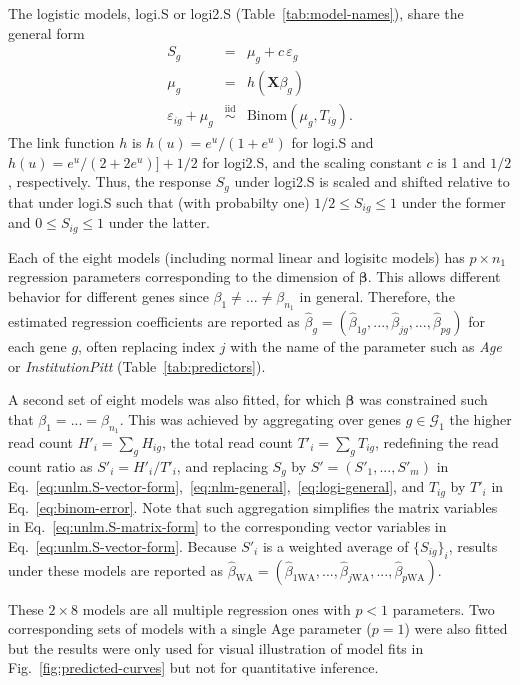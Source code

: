 \documentclass[12pt,letterpaper]{article}
\begin{document}
The logistic models, logi.S or logi2.S (Table~\ref{tab:model-names}), share the general form
\begin{eqnarray}
S_g &=& \mu_g + c\, \varepsilon_g
\label{eq:logi-general}
\\
\mu_g &=& h(\mathbf{X} \beta_g)
\label{eq:glm-mean-predictor}
\\
\varepsilon_{ig} + \mu_g &\overset{\mathrm{iid}}{\sim}& \mathrm{Binom}(\mu_g, T_{ig}).
\label{eq:binom-error}
\end{eqnarray}
The link function \(h\) is \(h(u) = e^u / (1 + e^u)\) for logi.S and \(h(u) =
e^u / (2 + 2e^u)] + 1/2\) for logi2.S, and the scaling constant \(c\) is 1
 and \(1/2\), respectively.  Thus, the response \(S_g\) under logi2.S is scaled and shifted relative to
that under logi.S such that (with probabilty one) \(1/2\le S_{ig}\le 1\) under the former and
\(0\le S_{ig}\le 1\) under the latter.

Each of the eight models (including normal linear and logisitc models) has \(p\times n_1\) regression parameters corresponding to the
dimension of \(\boldsymbol{\beta}\).  This allows different behavior for
different genes since \(\beta_1\neq ...\neq\beta_{n_1}\) in general.
Therefore, the estimated regression coefficients are reported as \(\hat{\beta}_g =
(\hat{\beta}_{1g},...,\hat{\beta}_{jg},...,\hat{\beta}_{pg})\) for each gene \(g\), often
replacing index \(j\) with the name of the parameter such as \emph{Age} or
\emph{InstitutionPitt} (Table~\ref{tab:predictors}).

A second set of eight models was also
fitted, for which \(\boldsymbol{\beta}\) was constrained such that \(\beta_1 =
... = \beta_{n_1}\).  This was achieved by aggregating over genes
\(g\in\mathcal{G}_1\) the higher read count \(H'_i = \sum_g H_{ig}\), the
total read count \(T'_i = \sum_g T_{ig}\), redefining the read count ratio
as \(S'_i = H'_i / T'_i\), and replacing \(S_g\) by \(S'=(S'_1,...,S'_m)\) in
Eq.~\ref{eq:unlm.S-vector-form},~\ref{eq:nlm-general},~\ref{eq:logi-general}, and \(T_{ig}\) by \(T'_i\) in
Eq.~\ref{eq:binom-error}.  Note that such aggregation
simplifies the matrix variables in Eq.~\ref{eq:unlm.S-matrix-form} to the
corresponding vector variables in Eq.~\ref{eq:unlm.S-vector-form}.  Because \(S'_i\) is a
weighted average of \(\{S_{ig}\}_i\), results under these models are reported
as \(\hat{\beta}_\mathrm{WA} =
(\hat{\beta}_{1\mathrm{WA}},...,\hat{\beta}_{j\mathrm{WA}},...,\hat{\beta}_{p\mathrm{WA}})\).

These \(2\times 8\) models are all multiple regression ones with \(p<1\)
parameters.  Two corresponding sets of models with a single Age parameter
(\(p=1\)) were also fitted but the results were only used for visual
illustration of model fits in Fig.~\ref{fig:predicted-curves} but not for
quantitative inference.
\end{document}
